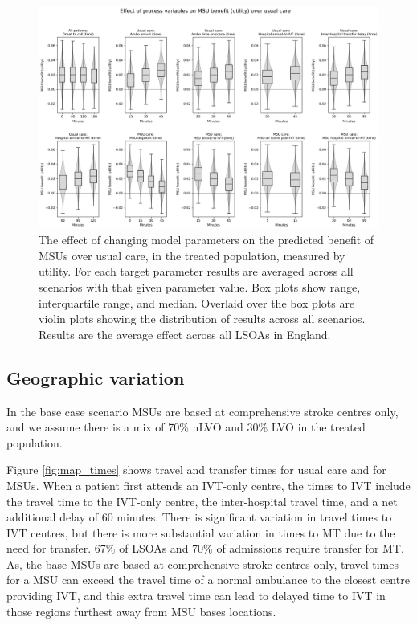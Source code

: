 \begin{figure}[h]
    \centering
    \includegraphics[width=1\linewidth]{images/msu_net_utility_benefit.png}
    \caption{The effect of changing model parameters on the predicted benefit of MSUs over usual care, in the treated population, measured by utility. For each target parameter results are averaged across all scenarios with that given parameter value. Box plots show range, interquartile range, and median. Overlaid over the box plots are violin plots showing the distribution of results across all scenarios. Results are the average effect across all LSOAs in England.}
    \label{fig:scenarios_utility}
\end{figure}

\subsection{Geographic variation}

In the base case scenario MSUs are based at comprehensive stroke centres only, and we assume there is a mix of 70\% nLVO and 30\% LVO in the treated population.

Figure \ref{fig:map_times} shows travel and transfer times for usual care and for MSUs. When a patient first attends an IVT-only centre, the times to IVT include the travel time to the IVT-only centre, the inter-hospital travel time, and a net additional delay of 60 minutes. There is significant variation in travel times to IVT centres, but there is more substantial variation in times to MT due to the need for transfer. 67\% of LSOAs and 70\% of admissions require transfer for MT. As, the base MSUs are based at comprehensive stroke centres only, travel times for a MSU can exceed the travel time of a normal ambulance to the closest centre providing IVT, and this extra travel time can lead to delayed time to IVT in those regions furthest away from MSU bases locations.

